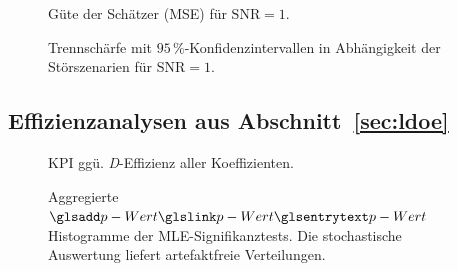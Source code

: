 \begin{figure}[htbp]
    \centering
    \setlength{}
    \setlength\figureheight{4cm}
    
    \caption{Güte der Schätzer (\ac{MSE}) für $\text{SNR}=1$.}
    \label{fig:app.c_msedev_snr1}
\end{figure}

\begin{figure}[htbp]
    \centering
    \setlength{}
    \setlength\figureheight{4cm}
    
    \caption{Trennschärfe mit $95\,\%$-Konfidenzintervallen in Abhängigkeit der Störszenarien für $\text{SNR}=1$.}
    \label{fig:app.c_powerdev_snr1}
\end{figure}

\clearpage

\subsection{Effizienzanalysen aus Abschnitt~\ref{sec:ldoe}} \label{app:c_effizienz}

\begin{figure}[htbp]
    \centering
    \setlength{}
    \setlength\figureheight{16cm}
    
    \caption{\ac{KPI} ggü. \textit{D}-Effizienz aller Koeffizienten.}
    \label{fig:app.c_kpi_all_coeffs}
\end{figure}

\begin{figure}[htbp]
    \centering
    \setlength{}
    \setlength\figureheight{5cm}
    
    \caption{Aggregierte $\sym{p-Wert}$ Histogramme der \ac{MLE}-Signifikanztests. Die stochastische Auswertung liefert artefaktfreie Verteilungen.}
    \label{fig:ma_abb5.4.3_phisto_all_wbl}
\end{figure}
